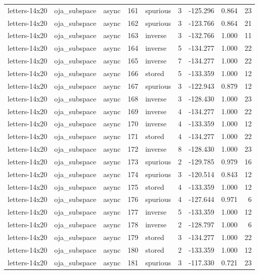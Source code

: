 \begin{tabular}{lllrlrrrr}
letters-14x20 & oja\_subspace & async & 161 & spurious & 3 & -125.296 & 0.864 & 23 \\
letters-14x20 & oja\_subspace & async & 162 & spurious & 3 & -123.766 & 0.864 & 21 \\
letters-14x20 & oja\_subspace & async & 163 & inverse & 3 & -132.766 & 1.000 & 11 \\
letters-14x20 & oja\_subspace & async & 164 & inverse & 5 & -134.277 & 1.000 & 22 \\
letters-14x20 & oja\_subspace & async & 165 & inverse & 7 & -134.277 & 1.000 & 22 \\
letters-14x20 & oja\_subspace & async & 166 & stored & 5 & -133.359 & 1.000 & 12 \\
letters-14x20 & oja\_subspace & async & 167 & spurious & 3 & -122.943 & 0.879 & 12 \\
letters-14x20 & oja\_subspace & async & 168 & inverse & 3 & -128.430 & 1.000 & 23 \\
letters-14x20 & oja\_subspace & async & 169 & inverse & 4 & -134.277 & 1.000 & 22 \\
letters-14x20 & oja\_subspace & async & 170 & inverse & 4 & -133.359 & 1.000 & 12 \\
letters-14x20 & oja\_subspace & async & 171 & stored & 4 & -134.277 & 1.000 & 22 \\
letters-14x20 & oja\_subspace & async & 172 & inverse & 8 & -128.430 & 1.000 & 23 \\
letters-14x20 & oja\_subspace & async & 173 & spurious & 2 & -129.785 & 0.979 & 16 \\
letters-14x20 & oja\_subspace & async & 174 & spurious & 3 & -120.514 & 0.843 & 12 \\
letters-14x20 & oja\_subspace & async & 175 & stored & 4 & -133.359 & 1.000 & 12 \\
letters-14x20 & oja\_subspace & async & 176 & spurious & 4 & -127.644 & 0.971 & 6 \\
letters-14x20 & oja\_subspace & async & 177 & inverse & 5 & -133.359 & 1.000 & 12 \\
letters-14x20 & oja\_subspace & async & 178 & inverse & 2 & -128.797 & 1.000 & 6 \\
letters-14x20 & oja\_subspace & async & 179 & stored & 3 & -134.277 & 1.000 & 22 \\
letters-14x20 & oja\_subspace & async & 180 & stored & 2 & -133.359 & 1.000 & 12 \\
letters-14x20 & oja\_subspace & async & 181 & spurious & 3 & -117.330 & 0.721 & 23 \\

\end{tabular}
